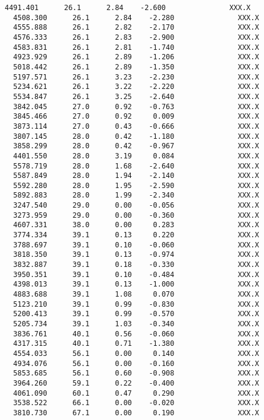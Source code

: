 \documentclass[11pt]{article}
\begin{document}
\begin{Verbatim}[commandchars=\\\{\}]
  4491.401      26.1      2.84    -2.600               XXX.X
  4508.300      26.1      2.84    -2.280               XXX.X
  4555.888      26.1      2.82    -2.170               XXX.X
  4576.333      26.1      2.83    -2.900               XXX.X
  4583.831      26.1      2.81    -1.740               XXX.X
  4923.929      26.1      2.89    -1.206               XXX.X
  5018.442      26.1      2.89    -1.350               XXX.X
  5197.571      26.1      3.23    -2.230               XXX.X
  5234.621      26.1      3.22    -2.220               XXX.X
  5534.847      26.1      3.25    -2.640               XXX.X
  3842.045      27.0      0.92    -0.763               XXX.X
  3845.466      27.0      0.92     0.009               XXX.X
  3873.114      27.0      0.43    -0.666               XXX.X
  3807.145      28.0      0.42    -1.180               XXX.X
  3858.299      28.0      0.42    -0.967               XXX.X
  4401.550      28.0      3.19     0.084               XXX.X
  5578.719      28.0      1.68    -2.640               XXX.X
  5587.849      28.0      1.94    -2.140               XXX.X
  5592.280      28.0      1.95    -2.590               XXX.X
  5892.883      28.0      1.99    -2.340               XXX.X
  3247.540      29.0      0.00    -0.056               XXX.X
  3273.959      29.0      0.00    -0.360               XXX.X
  4607.331      38.0      0.00     0.283               XXX.X
  3774.334      39.1      0.13     0.220               XXX.X
  3788.697      39.1      0.10    -0.060               XXX.X
  3818.350      39.1      0.13    -0.974               XXX.X
  3832.887      39.1      0.18    -0.330               XXX.X
  3950.351      39.1      0.10    -0.484               XXX.X
  4398.013      39.1      0.13    -1.000               XXX.X
  4883.688      39.1      1.08     0.070               XXX.X
  5123.210      39.1      0.99    -0.830               XXX.X
  5200.413      39.1      0.99    -0.570               XXX.X
  5205.734      39.1      1.03    -0.340               XXX.X
  3836.761      40.1      0.56    -0.060               XXX.X
  4317.315      40.1      0.71    -1.380               XXX.X
  4554.033      56.1      0.00     0.140               XXX.X
  4934.076      56.1      0.00    -0.160               XXX.X
  5853.685      56.1      0.60    -0.908               XXX.X
  3964.260      59.1      0.22    -0.400               XXX.X
  4061.090      60.1      0.47     0.290               XXX.X
  3538.522      66.1      0.00    -0.020               XXX.X
  3810.730      67.1      0.00     0.190               XXX.X


    \end{Verbatim}
\end{document}
